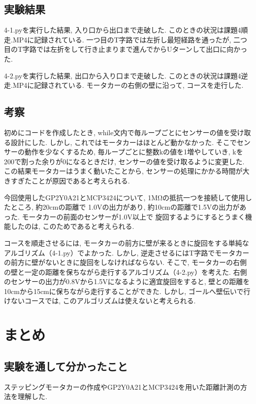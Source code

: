 \documentclass{ltjsarticle} %
\begin{document}
\subsection{実験結果}
4-1.pyを実行した結果, 入り口から出口まで走破した. このときの状況は課題4順走.MP4に記録されている. 
一つ目のT字路では左折し最短経路を通ったが, 二つ目のT字路では左折をして行き止まりまで進んでからUターンして出口に向かった. 

4-2.pyを実行した結果, 出口から入り口まで走破した. このときの状況は課題4逆走.MP4に記録されている. 
モータカーの右側の壁に沿って, コースを走行した. 


\subsection{考察}
初めにコードを作成したとき, while文内で毎ループごとにセンサーの値を受け取る設計にした. 
しかし, これではモータカーはほとんど動かなかった. 
そこでセンサーの動作を少なくするため, 毎ループごとに整数kの値を1増やしていき, 
kを200で割った余りが0になるときだけ, センサーの値を受け取るように変更した. 
この結果モータカーはうまく動いたことから, 
センサーの処理にかかる時間が大きすぎたことが原因であると考えられる. 

今回使用したGP2Y0A21とMCP3424について, 1MΩの抵抗一つを接続して使用したところ, 約20cmの距離で
1.0Vの出力があり, 約10cmの距離で1.5Vの出力があった. モータカーの前面のセンサーが1.0V以上で 
旋回するようにするとうまく機能したのは, このためであると考えられる. 

コースを順走させるには, モータカーの前方に壁が来るときに旋回をする単純なアルゴリズム（4-1.py）でよかった.  
しかし, 逆走させるにはT字路でモータカーの前方に壁がないときに旋回をしなければならない. 
そこで, モータカーの右側の壁と一定の距離を保ちながら走行するアルゴリズム（4-2.py）を考えた. 
右側のセンサーの出力が0.8Vから1.5Vになるように適宜旋回をすると, 壁との距離を10cmから15cmに保ちながら走行することができた.  
しかし, ゴールへ壁伝いで行けないコースでは, このアルゴリズムは使えないと考えられる. 


\section{まとめ}

\subsection{実験を通して分かったこと}
ステッピングモータカーの作成やGP2Y0A21とMCP3424を用いた距離計測の方法を理解した. 
\end{document}

